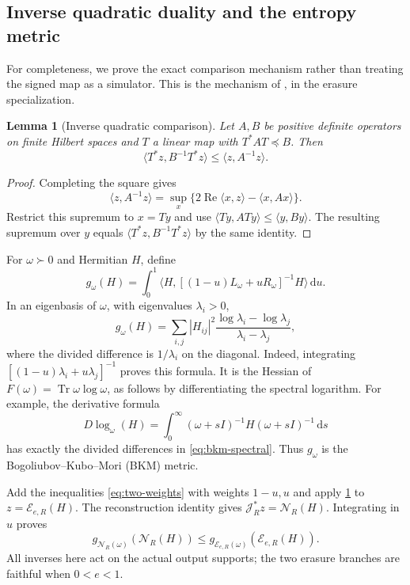 \documentclass[11pt]{article}
\numberwithin{equation}{section}
\newtheorem{lemma}[theorem]{Lemma}
\theoremstyle{definition}
\theoremstyle{remark}
\DeclareMathOperator{\Tr}{Tr}
\DeclareMathOperator{\Rea}{Re}
\newcommand{\N}{\mathcal N}
\newcommand{\E}{\mathcal E}
\newcommand{\ip}[2]{\langle #1,#2\rangle}
\newcommand{\dd}{\,\mathrm d}
\begin{document}
\subsection{Inverse quadratic duality and the entropy metric}

For completeness, we prove the exact comparison mechanism rather than treating
the signed map as a simulator. This is the mechanism of
\cite[Lemma~S6 and Theorem~S5]{ZW26v3}, in the erasure specialization.

\begin{lemma}[Inverse quadratic comparison]
\label{lem:inverse-duality}
Let $A,B$ be positive definite operators on finite Hilbert spaces and
$T$ a linear map with $T^*AT\preceq B$. Then
\[
 \ip{T^*z}{B^{-1}T^*z}\leq\ip z{A^{-1}z}.
\]
\end{lemma}
\begin{proof}
Completing the square gives
\[
 \ip z{A^{-1}z}
 =\sup_x\{2\Rea\ip xz-\ip x{Ax}\}.
\]
Restrict this supremum to $x=Ty$ and use
$\ip{Ty}{ATy}\leq\ip y{By}$. The resulting supremum over $y$
equals $\ip{T^*z}{B^{-1}T^*z}$ by the same identity.
\end{proof}

For $\omega\succ0$ and Hermitian $H$, define
\begin{equation}
 g_\omega(H)=
 \int_0^1
 \ip H{[(1-u)L_\omega+uR_\omega]^{-1}H}\dd u .
 \label{eq:bkm}
\end{equation}
In an eigenbasis of $\omega$, with eigenvalues $\lambda_i>0$,
\begin{equation}
 g_\omega(H)=\sum_{i,j}|H_{ij}|^2
 \frac{\log\lambda_i-\log\lambda_j}{\lambda_i-\lambda_j},
 \label{eq:bkm-spectral}
\end{equation}
where the divided difference is $1/\lambda_i$ on the diagonal.
Indeed, integrating $[(1-u)\lambda_i+u\lambda_j]^{-1}$ proves this formula.
It is the Hessian of $F(\omega)=\Tr\omega\log\omega$, as follows by
differentiating the spectral logarithm. For example, the derivative formula
\[
 D\log_\omega(H)=
 \int_0^\infty(\omega+sI)^{-1}H(\omega+sI)^{-1}\dd s
\]
has exactly the divided differences in \eqref{eq:bkm-spectral}. Thus
$g_\omega$ is the Bogoliubov--Kubo--Mori (BKM) metric.

Add the inequalities \eqref{eq:two-weights} with weights $1-u,u$ and apply
\cref{lem:inverse-duality} to $z=\E_{e,R}(H)$.
The reconstruction identity gives $\mathcal J_R^*z=\N_R(H)$.
Integrating in $u$ proves
\begin{equation}
 g_{\N_R(\omega)}(\N_R(H))
 \leq g_{\E_{e,R}(\omega)}(\E_{e,R}(H)).
 \label{eq:bkm-erasure}
\end{equation}
All inverses here act on the actual output supports; the two erasure
branches are faithful when $0<e<1$.
\end{document}
